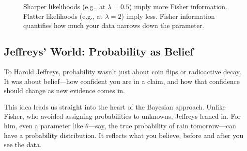 \begin{figure}[H]
\centering
{}
\caption{Sharper likelihoods (e.g., at \( \lambda = 0.5 \)) imply more Fisher information. Flatter likelihoods (e.g., at \( \lambda = 2 \)) imply less. Fisher information quantifies how much your data narrows down the parameter.}
\end{figure}




\subsection{Jeffreys’ World: Probability as Belief}

To Harold Jeffreys, probability wasn’t just about coin flips or radioactive decay. It was about belief—how confident you are in a claim, and how that confidence should change as new evidence comes in.

This idea leads us straight into the heart of the Bayesian approach. Unlike Fisher, who avoided assigning probabilities to unknowns, Jeffreys leaned in. For him, even a parameter like \( \theta \)—say, the true probability of rain tomorrow—can have a probability distribution. It reflects what you believe, before and after you see the data.

